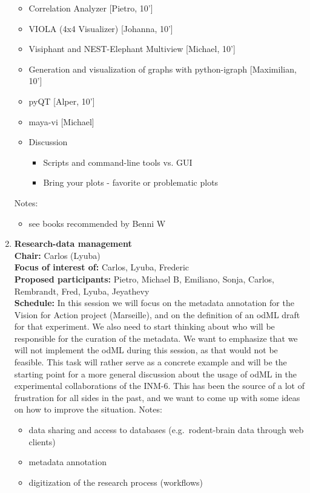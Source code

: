 \documentclass[10pt, a4paper,twoside,american]{article}
\begin{document}
\begin{enumerate}[resume]
\begin{itemize}
  \item Correlation Analyzer [Pietro, 10']
  \item VIOLA (4x4 Visualizer) [Johanna, 10']
  \item Visiphant and NEST-Elephant Multiview [Michael, 10']
  \item Generation and visualization of graphs with python-igraph [Maximilian, 10']
  \item pyQT [Alper, 10']
  \item maya-vi [Michael]
  \item Discussion
    \begin{itemize}
    \item Scripts and command-line tools vs. GUI
    \item Bring your plots - favorite or problematic plots
    \end{itemize}
  \end{itemize}
  Notes:
  \begin{itemize}
  \item see books recommended by Benni W
  \end{itemize}
\item {\large\bf Research-data management}\\[1ex]
  {\bf Chair:} Carlos (Lyuba)\\[1ex]
  {\bf Focus of interest of:} Carlos, Lyuba, Frederic\\[1ex]
  {\bf Proposed participants:} Pietro, Michael B, Emiliano, Sonja, Carlos, Rembrandt, Fred, Lyuba, Jeyathevy\\[1ex]
  {\bf Schedule:}
  In this session we will focus on the metadata annotation for the Vision for Action project (Marseille), and on the definition of an odML draft for that experiment. We also need to start thinking about who will be responsible for the curation of the metadata. We want to emphasize that we will not implement the odML during this session, as that would not be feasible. This task will rather serve as a concrete example and will be the starting point for a more general discussion about the usage of odML in the experimental collaborations of the INM-6. This has been the source of a lot of frustration for all sides in the past, and we want to come up with some ideas on how to improve the situation.
  Notes:
  \begin{itemize}
  \item data sharing and access to databases (e.g.~rodent-brain data through web clients)
  \item metadata annotation
  \item digitization of the research process (workflows)
  \end{itemize}
\end{enumerate}
\end{document}
